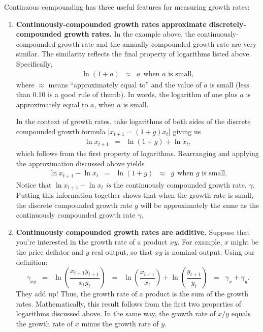 Continuous compounding has three useful features for measuring growth rates:
\begin{enumerate}
\item \textbf{Continuously-compounded growth rates approximate discretely-compounded growth rates.} In the example above, the continuously-compounded   growth rate and the annually-compounded growth rate are very similar. The similarity reflects the final property of logarithms listed above. Specifically,
\begin{eqnarray*}
    \ln (1 + a) &\approx& a \ \ \mbox{when $a$ is small},
\end{eqnarray*}
where $\approx$ means ``approximately equal to'' and the value of $a$ is small (less than 0.10 is a good rule of thumb). In words, the logarithm of one plus $a$ is approximately equal to $a$, when $a$ is small.

In the context of growth rates, take logarithms of both sides of the discrete compounded growth formula
[$x_{t+1} = (1+g)x_{t}$] giving us
\begin{eqnarray*}
    \ln x_{t+1} &=& \ln (1 + g) +  \ln x_t,
\end{eqnarray*}
which follows from the first property of logarithms. Rearranging and applying the approximation discussed above yields
\begin{eqnarray*}
\ln x_{t+1} - \ln x_t &=& \ln (1 + g) \;\;\approx\;\; g \ \ \mbox{when $g$ is small}.
\end{eqnarray*}
Notice that $ \ln x_{t+1} - \ln x_t $ \emph{is} the continuously compounded growth rate, $\gamma$.  Putting this information together shows that when the growth rate is small, the discrete compounded growth rate $g$ will be approximately the same as the continuously compounded growth rate $\gamma$.

\item \textbf{Continuously compounded growth rates are additive.} Suppose that you're interested in the growth rate of a product $xy$. For example, $x$ might be the price deflator and $y$ real output, so that $xy$ is nominal output.
Using our definition:
\[
    \gamma_{xy} \;\;=\;\; \ln \left( \frac{x_{t+1} y_{t+1}}{x_t y_t } \right)
                \;\;=\;\; \ln \left( \frac{x_{t+1}}{x_t} \right) + \ln \left( \frac{y_{t+1}}{y_t} \right)
                \;\;=\;\; \gamma_x + \gamma_y.
\]
They add up! Thus, the growth rate of a product is the sum of the
growth rates. Mathematically, this result follows from the first two properties of logarithms discussed above. In the same way, the growth rate of $x/y$ equals the growth rate of $x$ minus the growth rate of $y$.


\end{enumerate}
